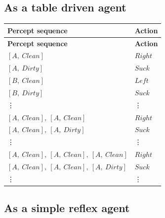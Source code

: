 \subsection{As a table driven agent}

\begin{customArrayStretch}{1.3}
\begin{longtable}{|l|l|}

\hline
\textbf{Percept sequence} & \textbf{Action} \\ \hline
\endhead

\hline
\textbf{Percept sequence} & \textbf{Action} \\ \hline
\endfirsthead

\hline\endfoot
\hline\endlastfoot


$[A, \ Clean]$ & $Right$ \\ 
$[A, \ Dirty]$ & $Suck$ \\ 
$[B, \ Clean]$ & $Left$ \\ 
$[B, \ Dirty]$ & $Suck$ \\ 

\vdots & \vdots \\

$[A, \ Clean],\ [A, \ Clean]$ & $Right$ \\ 
$[A, \ Clean],\ [A, \ Dirty]$ & $Suck$ \\ 

\vdots & \vdots \\

$[A, \ Clean],\ [A, \ Clean],\ [A, \ Clean]$ & $Right$ \\ 
$[A, \ Clean],\ [A, \ Clean],\ [A, \ Dirty]$ & $Suck$ \\ 

\vdots & \vdots \\

\end{longtable}
\end{customArrayStretch}





\subsection{As a simple reflex agent}

